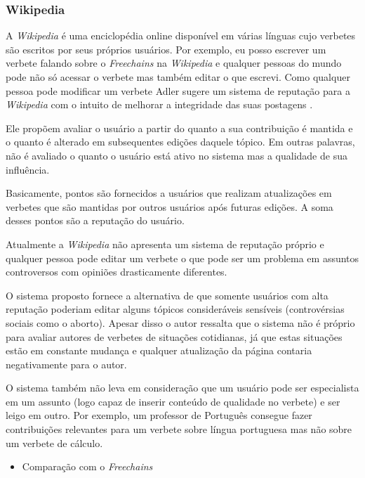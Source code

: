 \documentclass[12pt]{article}
\newcommand{\FC} {\textit{Freechains}\xspace}
\begin{document}
\subsubsection{Wikipedia} \label{subsub:wikipedia}

A \textit{Wikipedia} é uma enciclopédia online disponível em várias línguas cujo verbetes são escritos por seus próprios usuários.
Por exemplo, eu posso escrever um verbete falando sobre o \FC na \textit{Wikipedia} e qualquer pessoas do mundo pode não só acessar o verbete mas também editar o que escrevi.
Como qualquer pessoa pode modificar um verbete Adler sugere um sistema de reputação para a \textit{Wikipedia} com o intuito de melhorar a integridade das suas postagens \cite{adler2007content}.

Ele propõem avaliar o usuário a partir do quanto a sua contribuição é mantida e o quanto é alterado em subsequentes edições daquele tópico. 
Em outras palavras, não é avaliado o quanto o usuário está ativo no sistema mas a qualidade de sua influência. 

Basicamente, pontos são fornecidos a usuários que realizam atualizações em verbetes que são mantidas por outros usuários após futuras edições.
A soma desses pontos são a reputação do usuário. 

Atualmente a \textit{Wikipedia} não apresenta um sistema de reputação próprio e qualquer pessoa pode editar um verbete o que pode ser um problema em assuntos controversos com opiniões drasticamente diferentes.

O sistema proposto fornece a alternativa de que somente usuários com alta reputação poderiam editar alguns tópicos consideráveis sensíveis (controvérsias sociais como o aborto). 
Apesar disso o autor ressalta que o sistema não é próprio para avaliar autores de verbetes de situações cotidianas, já que estas situações estão em constante mudança e qualquer atualização da página contaria negativamente para o autor. 

O sistema também não leva em consideração que um usuário pode ser especialista em um assunto (logo capaz de inserir conteúdo de qualidade no verbete) e ser leigo em outro. 
Por exemplo, um professor de Português consegue fazer contribuições relevantes para um verbete sobre língua portuguesa mas não sobre um verbete de cálculo. 

\begin{itemize}
    \item Comparação com o \FC
\end{itemize}
\end{document}

